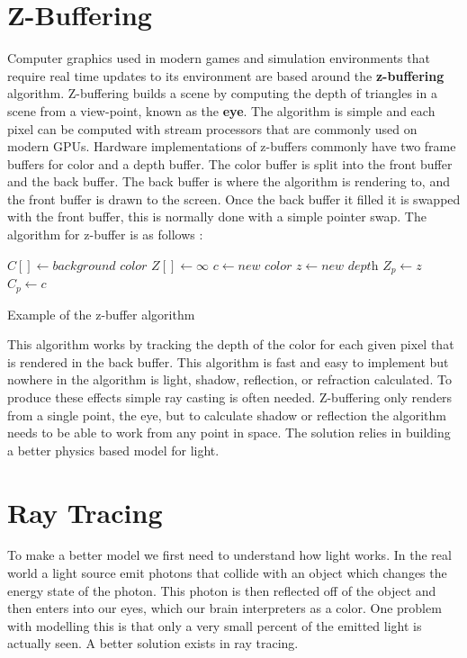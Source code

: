 \documentclass[11pt,a4paper,oneside]{article}
\begin{document}
\section{Z-Buffering}

Computer graphics used in modern games and simulation environments that require real time updates to its environment are based around the \textbf{z-buffering} algorithm.  Z-buffering builds a scene by computing the depth of triangles in a scene from a view-point,  known as the \textbf{eye}.  The algorithm is simple and each pixel can be computed with stream processors that are commonly  used on modern GPUs.  Hardware implementations of z-buffers commonly have two frame buffers for color and a depth buffer.    The color buffer is split into the front buffer and the back buffer.  The back buffer is where the algorithm is rendering to, and the front buffer is drawn to the screen.  Once the back buffer it filled it is swapped with the front buffer, this is normally done with a simple pointer swap.  The algorithm for z-buffer is as follows \cite{fast:2008}:

\begin{algorithm}
\begin{algorithmic}[1]
\STATE $C[ ] \gets \textit{background color}$ 
\STATE $Z[ ] \gets \infty$
		\STATE $c \gets \textit{new color}$
		\STATE $z \gets \textit{new depth}$
			\STATE $Z_{p} \gets z$
			\STATE $C_{p} \gets c$
		\ENDIF
	\ENDFOR
\ENDFOR
\end{algorithmic}
\caption{Example of the z-buffer algorithm}
\label{z-buffer}
\end{algorithm}

This algorithm works by tracking the depth of the color for each given pixel that is rendered in the back buffer.  This algorithm is fast and easy to implement but nowhere in the algorithm is light, shadow, reflection, or refraction calculated.  To produce these effects simple ray casting is often needed.  Z-buffering only renders from a single point, the eye, but to calculate shadow or reflection the algorithm needs to be able to work from any point in space.  The solution relies in building a better physics based model for light.

\section{Ray Tracing}

To make a better model we first need to understand how light works.  In the real world a light source emit photons that collide with an object which changes the energy state of the photon.  This photon is then reflected off of the object and then enters into our eyes, which our brain interpreters as a color.  One problem with modelling this is that only a very small percent of the emitted light is actually seen.  A better solution exists in ray tracing.  
\end{document}
